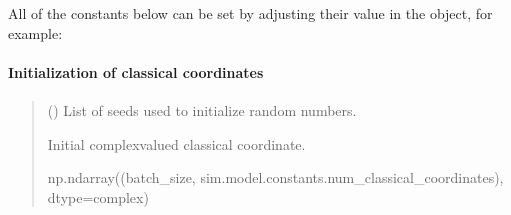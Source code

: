 \documentclass[letterpaper,10pt,english]{sphinxmanual}
\begin{document}
\sphinxAtStartPar
All of the constants below can be set by adjusting their value in the  object, for example:

\begin{sphinxVerbatim}[commandchars=\\\{\}]
  
\end{sphinxVerbatim}


\paragraph{Initialization of classical coordinates}
\label{\detokenize{user_guide/defaults:initialization-of-classical-coordinates}}

\begin{fulllineitems}
\label{\detokenize{user_guide/defaults:sim.model.init_classical}}
\pysigstartsignatures
\pysiglinewithargsret
{}
{\sphinxparamcomma {}\sphinxparamcomma {}\sphinxparamcomma {}}
{}
\pysigstopsignatures\begin{quote}\begin{description}
\sphinxAtStartPar
{} (\sphinxstyleliteralemphasis{\sphinxupquote{(}}\sphinxstyleliteralemphasis{\sphinxupquote{(}}\sphinxstyleliteralemphasis{\sphinxupquote{)}}\sphinxstyleliteralemphasis{\sphinxupquote{, }}\sphinxstyleliteralemphasis{\sphinxupquote{)}}) \textendash{} List of seeds used to initialize random numbers.

\sphinxAtStartPar
Initial complex\sphinxhyphen{}valued classical coordinate.

\sphinxAtStartPar
np.ndarray((batch\_size, sim.model.constants.num\_classical\_coordinates), dtype=complex)

\end{description}\end{quote}

\end{fulllineitems}
\end{document}
